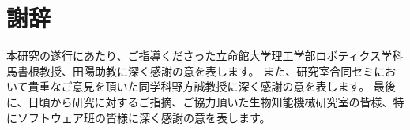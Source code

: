 \section*{謝辞}

本研究の遂行にあたり、ご指導くださった立命館大学理工学部ロボティクス学科 馬書根教授、田陽助教に深く感謝の意を表します。
また、研究室合同セミにおいて貴重なご意見を頂いた同学科野方誠教授に深く感謝の意を表します。
最後に、日頃から研究に対するご指摘、ご協力頂いた生物知能機械研究室の皆様、特にソフトウェア班の皆様に深く感謝の意を表します。
